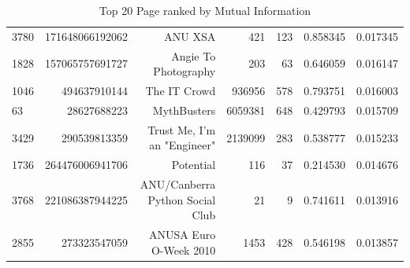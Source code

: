 \begin{table}
\begin{tabular}{| >{\small}l | >{\small}r | >{\small}r | >{\small}r | >{\small}r | >{\small}r |>{\small}r |}
3780 &  171648066192062 &                                            ANU XSA &       421 &      123 &             0.858345 &            0.017345 \\
1828 &  157065757691727 &                               Angie To Photography &       203 &       63 &             0.646059 &            0.016147 \\
1046 &     494637910144 &                                       The IT Crowd &    936956 &      578 &             0.793751 &            0.016003 \\
63   &      28627688223 &                                        MythBusters &   6059381 &      648 &             0.429793 &            0.015709 \\
3429 &     290539813359 &                        Trust Me, I'm an "Engineer" &   2139099 &      283 &             0.538777 &            0.015233 \\
1736 &  264476006941706 &                                          Potential &       116 &       37 &             0.214530 &            0.014676 \\
3768 &  221086387944225 &                    ANU/Canberra Python Social Club &        21 &        9 &             0.741611 &            0.013916 \\
2855 &     273323547059 &                             ANUSA Euro O-Week 2010 &      1453 &      428 &             0.546198 &            0.013857 \\
\hline
\end{tabular}
\caption{Top 20 Page ranked by Mutual Information}
\label {Top 20 Page ranked by Mutual Information}
\end{table}

\cleardoublepage

